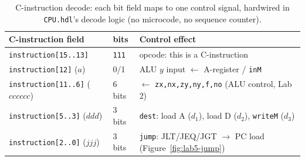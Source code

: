 \documentclass[11pt]{article}
\begin{document}
\begin{table}[h]
\centering
\small
\begin{tabular}{@{}l l l@{}}
\toprule
C-instruction field & bits & Control effect \\
\midrule
\texttt{instruction[15..13]} & \texttt{111} & opcode: this is a C-instruction \\
\texttt{instruction[12]} ($a$) & 0/1 & ALU $y$ input $\leftarrow$ A-register / \texttt{inM} \\
\texttt{instruction[11..6]} ($cccccc$) & 6 bits & $\leftarrow$ \texttt{zx,nx,zy,ny,f,no} (ALU control, Lab 2) \\
\texttt{instruction[5..3]} ($ddd$) & 3 bits & \texttt{dest}: load A ($d_1$), load D ($d_2$), \texttt{writeM} ($d_3$) \\
\texttt{instruction[2..0]} ($jjj$) & 3 bits & \texttt{jump}: JLT/JEQ/JGT $\to$ PC load (Figure~\ref{fig:lab5-jump}) \\
\bottomrule
\end{tabular}
\caption{C-instruction decode: each bit field maps to one control signal, hardwired in \texttt{CPU.hdl}'s decode logic (no microcode, no sequence counter).}
\label{tab:lab5-decode}
\end{table}
\end{document}
